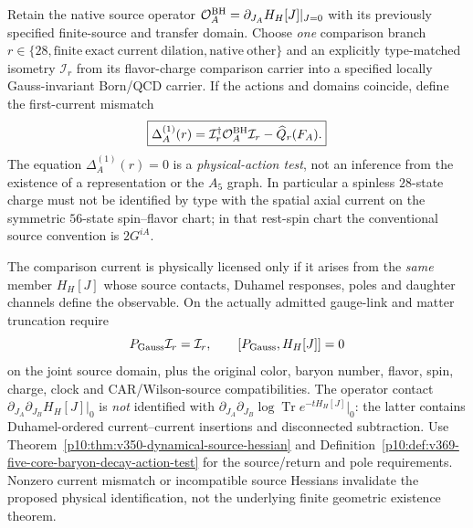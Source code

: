 \documentclass[12pt,a4paper]{article}
\begin{document}
\begin{definition}
\label{p10:def:fullcarrier-current-action-comparison}
Retain the native source operator
$\mathcal O_A^{\rm BH}=\partial_{J_A}H_H[J]|_{J=0}$
with its previously specified finite-source and transfer domain.
Choose \emph{one} comparison branch
$r\in\{28,\mathrm{finite\ exact\ current\ dilation},
\mathrm{native\ other}\}$ and an explicitly type-matched isometry
$\mathcal I_r$ from its flavor-charge comparison carrier into a
specified locally Gauss-invariant Born/QCD carrier.  If the actions
and domains coincide, define the first-current mismatch
\[
 \boxed{\Delta_A^{(1)}(r)=
 \mathcal I_r^\dagger\mathcal O_A^{\rm BH}\mathcal I_r
 -\widehat Q_r(F_A).}
\]
The equation $\Delta_A^{(1)}(r)=0$ is a \emph{physical-action test},
not an inference from the existence of a representation or the
$A_5$ graph.  In particular a spinless $28$-state charge must not be
identified by type with the spatial axial current on the symmetric
$56$-state spin--flavor chart; in that rest-spin chart the conventional
source convention is $2G^{iA}$.
\end{definition}

\begin{definition}
\label{p10:def:fullcarrier-source-jet-and-gauss-gate}
The comparison current is physically licensed only if it arises
from the \emph{same} member $H_H[J]$ whose source contacts, Duhamel
responses, poles and daughter channels define the observable.  On
the actually admitted gauge-link and matter truncation require
\[
 P_{\rm Gauss}\mathcal I_r=\mathcal I_r,\qquad
 [P_{\rm Gauss},H_H[J]]=0
\]
on the joint source domain, plus the original color, baryon number,
flavor, spin, charge, clock and CAR/Wilson-source compatibilities.
The operator contact
$\partial_{J_A}\partial_{J_B}H_H[J]|_0$ is \emph{not}
identified with $\partial_{J_A}\partial_{J_B}\log\operatorname{Tr}
 e^{-tH_H[J]}|_0$: the latter contains Duhamel-ordered
current--current insertions and disconnected subtraction.
Use Theorem~\ref{p10:thm:v350-dynamical-source-hessian} and
Definition~\ref{p10:def:v369-five-core-baryon-decay-action-test}
for the source/return and pole requirements.  Nonzero current mismatch
or incompatible source Hessians invalidate the proposed physical
identification, not the underlying finite geometric existence theorem.
\end{definition}
\end{document}

